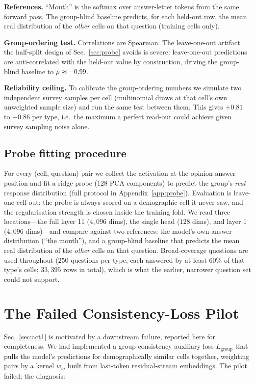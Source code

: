 \textbf{References.} ``Mouth'' is the softmax over answer-letter tokens
from the same forward pass. The group-blind baseline predicts, for each
held-out row, the mean real distribution of the \emph{other} cells on that
question (training cells only).

\textbf{Group-ordering test.} Correlations are Spearman. The
leave-one-out artifact the half-split design of Sec.~\ref{sec:probe}
avoids is severe: leave-one-out predictions are anti-correlated with the
held-out value by construction, driving the group-blind baseline to
$\rho\approx-0.99$.

\textbf{Reliability ceiling.} To calibrate the group-ordering numbers we
simulate two independent survey samples per cell (multinomial draws at
that cell's own unweighted sample size) and run the same test between
them. This gives $+0.81$ to $+0.86$ per type, i.e.\ the maximum a perfect
read-out could achieve given survey sampling noise alone.

\subsection{Probe fitting procedure}
\label{app:probe-procedure}
For every (cell, question) pair we collect the
activation at the opinion-answer position and fit a ridge probe (128 PCA
components) to predict the group's \emph{real} response distribution
(full protocol in Appendix~\ref{app:probe}).
Evaluation is leave-one-cell-out: the probe is always scored on a
demographic cell it never saw, and the regularisation strength is chosen
inside the training fold. We read three locations---the full layer 11
($4{,}096$ dims), the single head \starhead{} ($128$ dims), and layer 1
($4{,}096$ dims)---and compare against two references: the model's own
answer distribution (``the mouth''), and a group-blind baseline that
predicts the mean real distribution of the \emph{other} cells on that
question. Broad-coverage questions are used throughout ($250$ questions
per type, each answered by at least $60\%$ of that type's cells;
$33{,}395$ rows in total), which is what the earlier, narrower question
set could not support.

\section{The Failed Consistency-Loss Pilot}
\label{app:lgroup}
Sec.~\ref{sec:act1} is motivated by a downstream failure, reported
here for
completeness. We had implemented a group-consistency auxiliary loss
$L_{\text{group}}$ that pulls the model's predictions for demographically
similar cells together, weighting pairs by a kernel $w_{ij}$ built from
last-token residual-stream embeddings. The pilot failed; the diagnosis:

